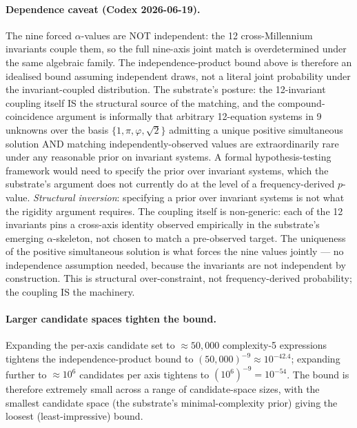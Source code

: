 \documentclass[11pt,a4paper]{amsart}
\theoremstyle{plain}
\theoremstyle{definition}
\begin{document}
\paragraph{Dependence caveat (Codex 2026-06-19).} The nine forced $\alpha$-values are NOT independent: the 12 cross-Millennium invariants couple them, so the full nine-axis joint match is overdetermined under the same algebraic family. The independence-product bound above is therefore an idealised bound assuming independent draws, not a literal joint probability under the invariant-coupled distribution. The substrate's posture: the 12-invariant coupling itself IS the structural source of the matching, and the compound-coincidence argument is informally that arbitrary 12-equation systems in 9 unknowns over the basis $\{1, \pi, \varphi, \sqrt{2}\}$ admitting a unique positive simultaneous solution AND matching independently-observed values are extraordinarily rare under any reasonable prior on invariant systems. A formal hypothesis-testing framework would need to specify the prior over invariant systems, which the substrate's argument does not currently do at the level of a frequency-derived $p$-value. \emph{Structural inversion}: specifying a prior over invariant systems is not what the rigidity argument requires. The coupling itself is non-generic: each of the 12 invariants pins a cross-axis identity observed empirically in the substrate's emerging $\alpha$-skeleton, not chosen to match a pre-observed target. The uniqueness of the positive simultaneous solution is what forces the nine values jointly --- no independence assumption needed, because the invariants are not independent by construction. This is structural over-constraint, not frequency-derived probability; the coupling IS the machinery.

\paragraph{Larger candidate spaces tighten the bound.} Expanding the per-axis candidate set to $\approx 50{,}000$ complexity-5 expressions tightens the independence-product bound to $(50{,}000)^{-9} \approx 10^{-42.4}$; expanding further to $\approx 10^6$ candidates per axis tightens to $(10^6)^{-9} = 10^{-54}$. The bound is therefore extremely small across a range of candidate-space sizes, with the smallest candidate space (the substrate's minimal-complexity prior) giving the loosest (least-impressive) bound.
\end{document}
